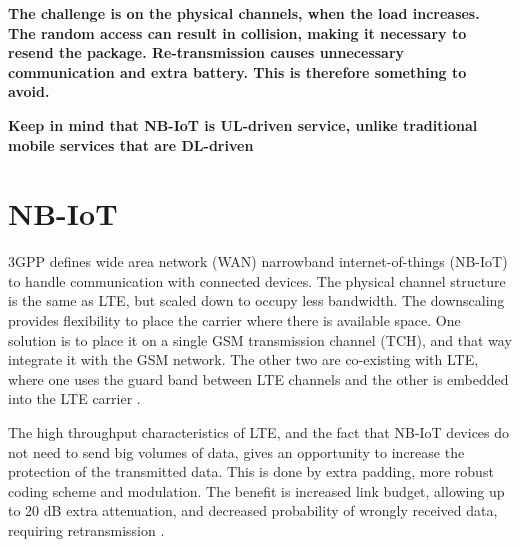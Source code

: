 \documentclass[10pt,a4paper,titlepage,twoside]{article}
\newcommand{\point}[1]{\textbf{\color{ymared} #1}}
\begin{document}


\vspace{2cm}

\point{The challenge is on the physical channels, when the load increases. The random access can result in collision, making it necessary to resend the package. Re-transmission causes unnecessary communication and extra battery. This is therefore something to avoid.}

\point{Keep in mind that NB-IoT is UL-driven service, unlike traditional mobile services that are DL-driven}

\clearpage
\section{NB-IoT}\label{theo}

3GPP defines wide area network (WAN) narrowband internet-of-things (NB-IoT) to handle communication with connected devices. The physical channel structure is the same as LTE, but scaled down to occupy less bandwidth. The downscaling provides flexibility to place the carrier where there is available space. One solution is to place it on a single  GSM transmission channel (TCH), and that way integrate it with the GSM network. The other two are co-existing with LTE, where one uses the guard band between LTE channels and the other is embedded into the LTE carrier \cite{schlienz}.

The high throughput characteristics of LTE, and the fact that NB-IoT devices do not need to send big volumes of data, gives an opportunity to increase the protection of the transmitted data. This is done by extra padding, more robust coding scheme and modulation. The benefit is increased link budget, allowing up to 20 dB extra attenuation, and decreased probability of wrongly received data, requiring retransmission \cite{wang}.
\end{document}
